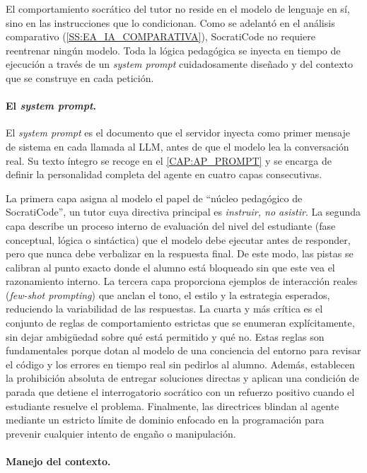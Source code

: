 El comportamiento socrático del tutor no reside en el modelo de lenguaje en sí, sino en las instrucciones que lo condicionan. Como se adelantó en el análisis comparativo (\autoref{SS:EA_IA_COMPARATIVA}), SocratiCode no requiere reentrenar ningún modelo. Toda la lógica pedagógica se inyecta en tiempo de ejecución a través de un \textit{system prompt} cuidadosamente diseñado y del contexto que se construye en cada petición.

\paragraph{El \textit{system prompt}.}

El \textit{system prompt} es el documento que el servidor inyecta como primer mensaje de sistema en cada llamada al LLM, antes de que el modelo lea la conversación real. Su texto íntegro se recoge en el \autoref{CAP:AP_PROMPT} y se encarga de definir la personalidad completa del agente en cuatro capas consecutivas.

La primera capa asigna al modelo el papel de ``núcleo pedagógico de SocratiCode'', un tutor cuya directiva principal es \textit{instruir, no asistir}. La segunda capa describe un proceso interno de evaluación del nivel del estudiante (fase conceptual, lógica o sintáctica) que el modelo debe ejecutar antes de responder, pero que nunca debe verbalizar en la respuesta final. De este modo, las pistas se calibran al punto exacto donde el alumno está bloqueado sin que este vea el razonamiento interno. La tercera capa proporciona ejemplos de interacción reales (\textit{few-shot prompting}) que anclan el tono, el estilo y la estrategia esperados, reduciendo la variabilidad de las respuestas. La cuarta y más crítica es el conjunto de reglas de comportamiento estrictas que se enumeran explícitamente, sin dejar ambigüedad sobre qué está permitido y qué no. Estas reglas son fundamentales porque dotan al modelo de una conciencia del entorno para revisar el código y los errores en tiempo real sin pedirlos al alumno. Además, establecen la prohibición absoluta de entregar soluciones directas y aplican una condición de parada que detiene el interrogatorio socrático con un refuerzo positivo cuando el estudiante resuelve el problema. Finalmente, las directrices blindan al agente mediante un estricto límite de dominio enfocado en la programación para prevenir cualquier intento de engaño o manipulación. 

\paragraph{Manejo del contexto.}

